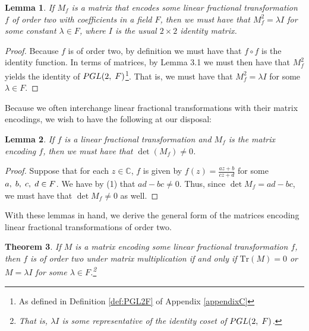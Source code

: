 \documentclass[12pt]{article}
\newcommand{\C}{\mathbb{C}}
\newcommand{\ttc}{, \hspace{1mm}}
\newcommand{\Tr}{\text{Tr}}
\theoremstyle{plain}
\newtheorem{theorem}{Theorem}[section]
\newtheorem{lemma}[theorem]{Lemma}
\theoremstyle{definition}
\begin{document}
\begin{lemma}
	If $M_f$ is a matrix that encodes some linear fractional transformation $f$ of order two with coefficients in a field $F$, then we must have that $M_f^2 = \lambda I$ for some constant $\lambda \in F$, where $I$ is the usual $2 \times 2$ identity matrix. 
\end{lemma}

\begin{proof}
	Because $f$ is of order two, by definition we must have that $f \circ f$ is the identity function. In terms of matrices, by Lemma 3.1 we must then have that $M_f^2$ yields the identity of $PGL(2\ttc F)$\footnote{As defined in Definition \ref{def:PGL2F} of Appendix \ref{appendixC}}. That is, we must have that $M_f^2 = \lambda I$ for some $\lambda \in F$.
\end{proof}

Because we often interchange linear fractional transformations with their matrix encodings, we wish to have the following at our disposal:

\begin{lemma}
	If $f$ is a linear fractional transformation and $M_f$ is the matrix encoding $f$, then we must have that $\det(M_f) \neq 0$.
\end{lemma}

\begin{proof}
	Suppose that for each $z \in \C$, $f$ is given by $f(z) = \frac{az+b}{cz+d}$ for some $a\ttc b\ttc c\ttc d \in F$. We have by (1) that $ad-bc \neq 0$. Thus, since $\det M_f = ad-bc$, we must have that $\det M_f \neq 0$ as well.
\end{proof}

With these lemmas in hand, we derive the general form of the matrices encoding linear fractional transformations of order two. 

\begin{theorem}
If $M$ is a matrix encoding some linear fractional transformation $f$, then $f$ is of order two under matrix multiplication if and only if $\Tr(M) = 0$ or $M = \lambda I$ for some $\lambda \in F$.\footnote{That is, $\lambda I$ is some representative of the identity coset of $PGL(2\ttc F)$.}
\end{theorem}
\end{document}
